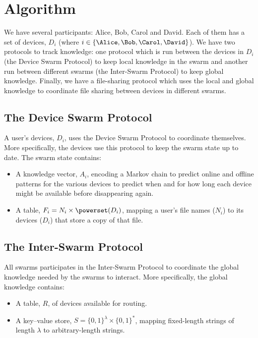 \section{Algorithm}%
\label{Algorithm}


We have several participants: Alice, Bob, Carol and David.
Each of them has a set of devices, \(D_i\) (where \(i\in \{\Alice, \Bob, \Carol, 
  \David\}\)).
We have two protocols to track knowledge: one protocol which is run between the 
devices in \(D_i\) (the Device Swarm Protocol) to keep local knowledge in the 
swarm and another run between different swarms (the Inter-Swarm Protocol) to 
keep global knowledge.
Finally, we have a file-sharing protocol which uses the local and global 
knowledge to coordinate file sharing between devices in different swarms.

\subsection{The Device Swarm Protocol}%
\label{DeviceSwarmProtocol}

A user's devices, \(D_i\), uses the Device Swarm Protocol to coordinate 
themselves.
More specifically, the devices use this protocol to keep the swarm state up to 
date.
The swarm state contains:
\begin{itemize}
  \item A knowledge vector, \(A_i\), encoding a Markov chain to predict online 
    and offline patterns for the various devices to predict when and for how 
    long each device might be available before disappearing again.
  \item A table, \(F_i = N_i\times \powerset(D_i)\), mapping a user's file names 
    (\(N_i\)) to its devices (\(D_i\)) that store a copy of that file.
\end{itemize}


\subsection{The Inter-Swarm Protocol}%
\label{InterSwarmProtocol}

All swarms participates in the Inter-Swarm Protocol to coordinate the global 
knowledge needed by the swarms to interact.
More specifically, the global knowledge contains:
\begin{itemize}
  \item A table, \(R\), of devices available for routing.
  \item A key--value store, \(S = \{0, 1\}^\lambda\times \{0, 1\}^*\), mapping 
    fixed-length strings of length \(\lambda\) to arbitrary-length strings.
\end{itemize}

